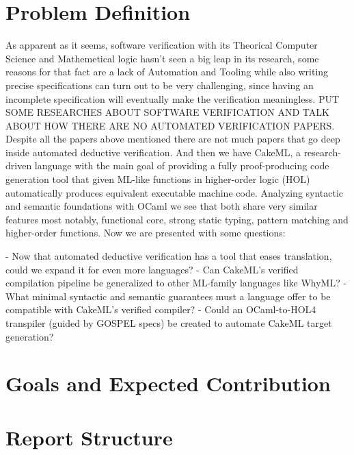 \section{Problem Definition}
\label{sec:Problem_Definition}

As apparent as it seems, software verification with its Theorical Computer Science and Mathemetical logic
hasn't seen a big leap in its research, some reasons for that fact are a lack of Automation and Tooling while also
writing precise specifications can turn out to be very challenging, since having an incomplete specification will eventually
make the verification meaningless. PUT SOME RESEARCHES ABOUT SOFTWARE VERIFICATION AND TALK ABOUT HOW THERE ARE NO AUTOMATED VERIFICATION PAPERS.
Despite all the papers above mentioned there are not much papers that go deep inside automated deductive verification.
And then we have CakeML, a research-driven language with the main goal of providing a fully proof-producing code generation tool 
that given ML-like functions in higher-order logic (HOL) automatically produces equivalent executable machine code. Analyzing
syntactic and semantic foundations with OCaml we see that both share very similar features most notably, functional core, 
strong static typing, pattern matching and higher-order functions.
Now we are presented with some questions:

- Now that automated deductive verification has a tool that eases translation, could we expand it for even more languages?
- Can CakeML's verified compilation pipeline be generalized to other ML-family languages like WhyML?
- What minimal syntactic and semantic guarantees must a language offer to be compatible with CakeML's verified compiler?
- Could an OCaml-to-HOL4 transpiler (guided by GOSPEL specs) be created to automate CakeML target generation?

\section{Goals and Expected Contribution}
\label{sec:Goals_and_Expected_Contribution}

\section{Report Structure}
\label{sec:Report_Structure}